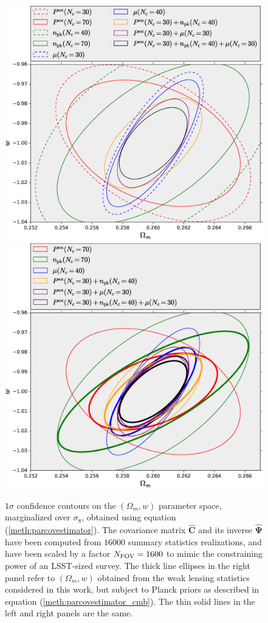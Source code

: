 \documentclass[reprint,aps,prd,superscriptaddress,showkeys,showpacs]{revtex4-1}
\newcommand{\bbh}[1]{\mathbf{\hat{#1}}}
\begin{document}
\begin{figure}
\includegraphics[scale=0.3]{Figures/constraints_Om-w_lensing.eps}
\includegraphics[scale=0.3]{Figures/constraints_Om-w_lensing_cmb.eps}
\caption{$1\sigma$ confidence contours on the $(\Omega_m,w)$ parameter space, marginalized over $\sigma_8$, obtained using equation (\ref{meth:parcovestimator}). The covariance matrix $\bbh{C}$ and its inverse $\bbh{\Psi}$ have been computed from $16000$ summary statistics realizations, and have been scaled by a factor $N_{\rm FOV}=1600$ to mimic the constraining power of an LSST-sized survey. The thick line ellipses in the right panel refer to $(\Omega_m,w)$ obtained from the weak lensing statistics considered in this work, but subject to Planck priors as described in equation (\ref{meth:parcovestimator_cmb}). The thin solid lines in the left and right panels are the same.}
\label{fig:constraintsOm-w}
\end{figure}
\end{document}
